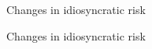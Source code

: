 \documentclass{beamer}
\begin{document}
\begin{frame}{Changes in idiosyncratic risk}




\end{frame}

\begin{frame}{Changes in idiosyncratic risk}




\end{frame}
\end{document}
